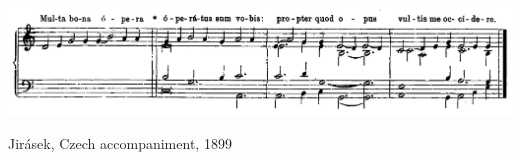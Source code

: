 \vspace*{\fill}


\begin{example}
  \centering
  \includegraphics[width=\linewidth]{c/1/ex/orel_jirasek_66-7.png}
  \caption{Jirásek, Czech accompaniment, 1899}
  \label{mus:orel_jirasek_66-7}
\end{example}

\vspace*{\fill}

\newpage
